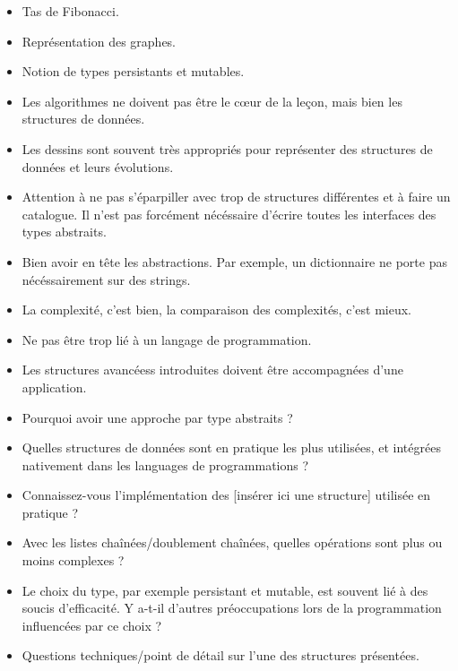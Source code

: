 \documentclass{agregfiche}
\begin{document}
\secidees

\begin{itemize}
	\item Tas de Fibonacci.
	\item Représentation des graphes.
    	\item Notion de types persistants et mutables.
\end{itemize}

\secpieges

\begin{itemize}
	\item Les algorithmes ne doivent pas être le c\oe ur de la leçon, mais bien les structures de données.
	\item Les dessins sont souvent très appropriés pour représenter des structures de données et leurs évolutions.
   	\item Attention à ne pas s'éparpiller avec trop de structures différentes et à faire un catalogue. Il n'est pas forcément nécéssaire d'écrire toutes les interfaces des types abstraits.
	\item Bien avoir en tête les abstractions. Par exemple, un dictionnaire ne porte pas nécéssairement sur des strings.
	\item La complexité, c'est bien, la comparaison des complexités, c'est mieux.
	\item Ne pas être trop lié à un langage de programmation.
	\item Les structures avancéess introduites doivent être accompagnées d'une application.
\end{itemize}

\secquestionsclassiques

\begin{itemize}
	\item Pourquoi avoir une approche par type abstraits ?
	\item Quelles structures de données sont en pratique les plus 
	utilisées, et intégrées nativement dans les languages de 
	programmations ?
	\item Connaissez-vous l'implémentation des [insérer ici une 
	structure] utilisée en pratique ?
	\item Avec les listes chaînées/doublement chaînées, quelles 
	opérations sont plus ou moins complexes ?
	\item Le choix du type, par exemple persistant et mutable, est souvent lié à des soucis d'efficacité. Y a-t-il d'autres préoccupations lors de la programmation influencées par ce choix ?
    \item Questions techniques/point de détail sur l'une des structures présentées.
\end{itemize}
\end{document}
